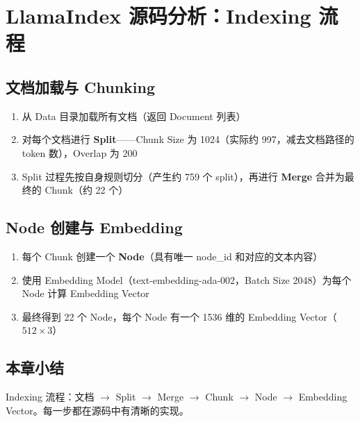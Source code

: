 \section{LlamaIndex 源码分析：Indexing 流程}

\subsection{文档加载与 Chunking}

\begin{enumerate}
    \item 从 Data 目录加载所有文档（返回 Document 列表）
    \item 对每个文档进行 \textbf{Split}——Chunk Size 为 1024（实际约 997，减去文档路径的 token 数），Overlap 为 200
    \item Split 过程先按自身规则切分（产生约 759 个 split），再进行 \textbf{Merge} 合并为最终的 Chunk（约 22 个）
\end{enumerate}

\subsection{Node 创建与 Embedding}

\begin{enumerate}
    \item 每个 Chunk 创建一个 \textbf{Node}（具有唯一 node\_id 和对应的文本内容）
    \item 使用 Embedding Model（text-embedding-ada-002，Batch Size 2048）为每个 Node 计算 Embedding Vector
    \item 最终得到 22 个 Node，每个 Node 有一个 1536 维的 Embedding Vector（$512 \times 3$）
\end{enumerate}

\subsection{本章小结}

Indexing 流程：文档 $\rightarrow$ Split $\rightarrow$ Merge $\rightarrow$ Chunk $\rightarrow$ Node $\rightarrow$ Embedding Vector。每一步都在源码中有清晰的实现。

